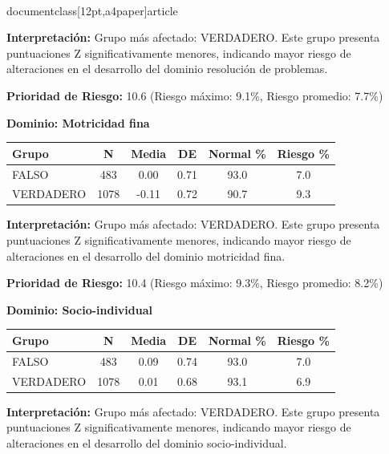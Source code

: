 \\documentclass[12pt,a4paper]{article}
\begin{document}
\textbf{Interpretación:} Grupo más afectado: VERDADERO. Este grupo presenta puntuaciones Z significativamente menores, indicando mayor riesgo de alteraciones en el desarrollo del dominio resolución de problemas.

\textbf{Prioridad de Riesgo:} 10.6 (Riesgo máximo: 9.1\%, Riesgo promedio: 7.7\%)


\vspace{0.5cm}


\textbf{Dominio: Motricidad fina}


\begin{center}
\begin{tabular}{|l|c|c|c|c|c|}
\hline
\textbf{Grupo} & \textbf{N} & \textbf{Media} & \textbf{DE} & \textbf{Normal \%} & \textbf{Riesgo \%} \\
\hline
FALSO & 483 & 0.00 & 0.71 & 93.0 & 7.0 \\
VERDADERO & 1078 & -0.11 & 0.72 & 90.7 & 9.3 \\

\hline
\end{tabular}
\end{center}


\textbf{Interpretación:} Grupo más afectado: VERDADERO. Este grupo presenta puntuaciones Z significativamente menores, indicando mayor riesgo de alteraciones en el desarrollo del dominio motricidad fina.

\textbf{Prioridad de Riesgo:} 10.4 (Riesgo máximo: 9.3\%, Riesgo promedio: 8.2\%)


\vspace{0.5cm}


\textbf{Dominio: Socio-individual}


\begin{center}
\begin{tabular}{|l|c|c|c|c|c|}
\hline
\textbf{Grupo} & \textbf{N} & \textbf{Media} & \textbf{DE} & \textbf{Normal \%} & \textbf{Riesgo \%} \\
\hline
FALSO & 483 & 0.09 & 0.74 & 93.0 & 7.0 \\
VERDADERO & 1078 & 0.01 & 0.68 & 93.1 & 6.9 \\

\hline
\end{tabular}
\end{center}


\textbf{Interpretación:} Grupo más afectado: VERDADERO. Este grupo presenta puntuaciones Z significativamente menores, indicando mayor riesgo de alteraciones en el desarrollo del dominio socio-individual.
\end{document}
